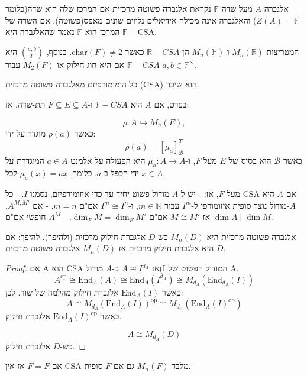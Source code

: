\documentclass{tstextbook}
\begin{document}
\begin{definition}
אלגברה \(A\) מעל שדה \(\mathbb{F}\) נקראת אלגברה פשוטה מרכזית אם המרכז שלה הוא שדה(כלומר \(Z(A) = \mathbb{F}\)) והאלגברה אינה מכילה אידיאלים נלווים שונים מאפס(פשוטה). אם השדה של המרכז הוא \(\mathbb{F}\) נאמר שהאלגברה היא \(\mathbb{F}-\mathrm{CSA}\).

\end{definition}
\begin{example}
המטריצות \(M_{n}(\mathbb{R})\) ו-\(M_{n}(\mathbb{H})\) הן \(\mathbb{R}-CSA\) כאשר \(\text{char}(F) \neq 2\).
בנוסף, \(\left( \frac{a,b}{F} \right)\) היא \(\mathbb{F}-CSA\) אם היא חוג חילוק או \(M_{2}(F)\) עבור \(a, b \in \mathbb{F}^{\times}\).

\end{example}
\begin{proposition}
כל הומומורפיזם מאלגברה פשוטה מרכזית (CSA) הוא שיכון.

\end{proposition}
\begin{corollary}
בפרט, אם \(A\) היא \(\mathbb{F}-CSA\) ו-\(F \subseteq E \subseteq A\) תת-שדה, אז:

$$\rho: A \hookrightarrow M_{n}(E),$$
כאשר \(\rho(a)\) מוגדר על ידי:
$$\rho(a) = [\mu_{a}]_\mathcal{B}^T$$
כאשר \(\mathcal{B}\) הוא בסיס של \(E\) מעל \(F\), ו-\(\mu_{a}: A \to A\) היא הפעולה על אלמנט \(a \in A\) המוגדרת על ידי הכפל ב-\(a\). כלומר, \(\mu_{a}(x) = ax\) לכל \(x \in A\).

\end{corollary}
\begin{proposition}
אם \(A\) היא \(\mathrm{CSA}\) מעל \(F\), אז:
-  יש ל-\(A\) מודול פשוט יחיד עד כדי איזומורפיזם, נסמנו \(I\).
-  כל \(A\)-מודול נוצר סופית איזומורפי ל-\(I^{m}\) עבור \(m \in \mathbb{N}\), ו-\(I^{m} \cong I^{n}\) אם"ם \(m = n\).
-  אם \(A^{M,M'}\), אז \(M \cong M'\) אם"ם \(\dim_{F}M = \dim_{F}M'\).
-  \(A^{M}\) חופשי אם"ם \(\dim A \mid \dim M\).

\end{proposition}
\begin{theorem}
אלגברה פשוטה מרכזית היא \(M_{n}(D)\) כש-\(D\) אלגברת חילוק מרכזית (ולהיפך). להיפך: אם \(D\) היא אלגברת חילוק מרכזית אז \(M_{n}(D)\) אלגברה פשוטה מרכזית.

\end{theorem}
\begin{proof}
אם A הוא CSA אז \(A\cong I^{d_{A}}\) כ-\(A\) מודול(I המודול הפשוט של A. 
$$A^{\text{op}}\cong  \mathrm{End}_{A}(A)\cong  \mathrm{End} _{A}(I^{d_{A}})\cong  M_{d_{A}}(\mathrm{End} _{d_{A}}(I))$$
כאשר \(\mathrm{End}_{A}(I)\) אלגברת חילוק מהלמה של שור. לכן:
$$A\cong  M_{d_{A}}(\mathrm{End} _{A}(I))^{\text{op}}\cong  M_{d_{A}}(\mathrm{End} _{A}(I)^{\text{op}})$$
כאשר \(\mathrm{End}_{A}(I)^{\text{op}}\) אלגברת חילוק.

$$A\cong  M_{d_{A}}(D)$$
כש-\(D\) אלגברת חילוק.

\end{proof}
\begin{corollary}
אם \(\overline{F} = F\) אז אין CSA מלבד \(M_{n}(F)\) גם אם \(F\) סופית.

\end{corollary}
\end{document}

